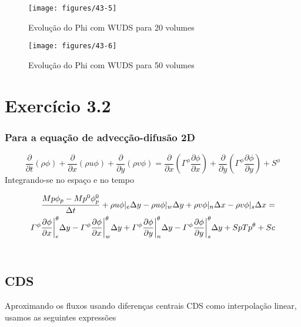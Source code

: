 \documentclass[]{article}
\begin{document}
\begin{figure}[H]
	\centering
	\texttt{[image: figures/43-5]}
	\caption{Evolução do Phi com WUDS para 20 volumes}
\end{figure}

\begin{figure}[H]
	\centering
	\texttt{[image: figures/43-6]}
	\caption{Evolução do Phi com WUDS para 50 volumes}
\end{figure}

\section*{Exercício 3.2}
\subsubsection*{Para a equação de advecção-difusão 2D}

\begin{equation}
	\frac{\partial}{\partial t} (\rho \phi) + \frac{\partial}{\partial x} (\rho u \phi) + \frac{\partial}{\partial y} (\rho v \phi) = \frac{\partial}{\partial x} \left( \Gamma^\phi \frac{\partial \phi}{\partial x} \right) + \frac{\partial}{\partial y} \left( \Gamma^\phi \frac{\partial \phi}{\partial y} \right) + S^\phi
\end{equation}
Integrando-se no espaço e no tempo

\begin{equation}
	\begin{aligned}
		\frac{Mp \phi_{p} - Mp^{0}\phi_{p}^{0}}{\Delta t} + \rho u \phi\arrowvert_{e}\Delta y - \rho u \phi\arrowvert_{w}\Delta y + \rho v \phi\arrowvert_{n}\Delta x - \rho v \phi\arrowvert_{s}\Delta x = \\
		\varGamma^{\phi} \frac{\partial\phi}{\partial x}\bigg|^{\theta}_{e}\Delta y - \varGamma^{\phi} \frac{\partial\phi}{\partial x}\bigg|^{\theta}_{w}\Delta y + \varGamma^{\phi} \frac{\partial\phi}{\partial y}\bigg|^{\theta}_{n}\Delta y - \varGamma^{\phi} \frac{\partial\phi}{\partial y}\bigg|^{\theta}_{s}\Delta y + SpTp^{\theta} + Sc
	\end{aligned}
\end{equation}\\

\subsection*{CDS}

Aproximando os fluxos usando diferenças centrais CDS como interpolação linear, usamos as seguintes expressões
\end{document}
